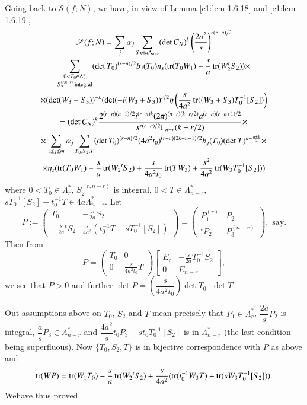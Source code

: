 Going back to $\mathscr{S}(f;N)$, we have, in view of Lemma
\ref{c1:lem-1.6.18} and \ref{c1:lem-1.6.19}, 
\begin{gather*}
\mathscr{S}(f;N)=\sum_{j}\alpha_{j}\sum_{S_{3}\in a\Lambda_{n-r}}(\det
C_{N})^{k}\left(\frac{2a^{2}}{s}\right)^{r(r-n)/2}\\
\sum_{\substack{0<T_{0}\in\Lambda^{\ast}_{r}\\ S_{2}^{(r,n-r)}\text{
      integral}}}(\det
T_{0})^{(r-n)/2}b_{j}(T_{0})n_{s}(\operatorname{tr}(T_{0}W_{1})-\frac{s}{a}\operatorname{tr}(W^{t}_{2}S_{2}))\times
\\
\times (\det
(W_{3}+S_{3}))^{-k}(\det(-i(W_{3}+S_{3}))^{r/2}\eta\left(\frac{s}{4a^{2}}\operatorname{tr}((W_{3}+S_{3})T^{-1}_{0}[S_{2}])\right)\\
=(\det
C_{N})^{k}\frac{2^{(r-n)(n-1)/2}i^{(r-n)k}(2\pi)^{(n-r)(k-r/2)}a^{(r-n)(r+n+1)/2}}{s^{r(r-n)/2}\Gamma_{n-r}(k-r/2)}\times\\
\times \sum_{1\leq j\leq m}\alpha_{j}\sum_{T_{0},S_{2},T}(\det
T_{0})^{(r-n)/2}(4a^{2}t_{0})^{(r-n)(2k-n-1)/2}b_{j}(T_{0})(\det
T)^{k-\frac{n+1}{2}}\times\\
\times \eta_{s}(\operatorname{tr}(T_{0}W_{1})-\frac{s}{a}\operatorname{tr}(W_{2}{}^{t}S_{2})+\frac{s}{4a^{2}t_{0}}\operatorname{tr}(TW_{3})+\frac{s^{2}}{4a^{2}}\operatorname{tr}(W_{3}T^{-1}_{0}[S_{2}]))
\end{gather*}\pageoriginale
where $0<T_{0}\in\Lambda^{\ast}_{r}$, $S^{(r,n-r)}_{2}$ is integral,
$0<T\in \Lambda^{\ast}_{n-r}$, $sT^{-1}_{0}[S_{2}]+t^{-1}_{0}T\in
4a\Lambda^{\ast}_{n-r}$. Let
$$
P:=
\begin{pmatrix}
T_{0} & -\frac{s}{2a}S_{2}\\
-\frac{s}{2a}{}^{t}S_{2} & \frac{s}{4a^{2}}(t^{-1}_{0}T+sT^{-1}_{0}[S_{2}])
\end{pmatrix}
=
\begin{pmatrix}
P^{(r)}_{1} & P_{2}\\
{}^{t}P_{2} & P^{(n-r)}_{3}
\end{pmatrix}
,\text{ \  say.}
$$
Then from
$$
P=
\begin{pmatrix}
T_{0} & 0\\
0 & \frac{s}{4a^{2}t_{0}}T
\end{pmatrix}
\begin{bmatrix}
E_{r} & -\frac{s}{2a}T^{-1}_{0}S_{2}\\
0 & E_{n-r}
\end{bmatrix},
$$
we see that $P>0$ and further $\det
P=\left(\dfrac{s}{4a^{2}t_{0}}\right)\det T_{0}\cdot \det T$.

Out assumptions above on $T_{0}$, $S_{2}$ and $T$ mean precisely that
$P_{1}\in\Lambda^{\ast}_{r}$, $\dfrac{2a}{s}P_{2}$ is integral,
$\dfrac{a}{s}P_{3}\in\Lambda^{\ast}_{n-r}$ and
$\dfrac{4a^{2}}{s}t_{0}P_{3}-st_{0}T^{-1}_{0}[S_{2}]$ is in
$\Lambda^{\ast}_{n-r}$ (the last condition being superfluous). Now
$\{T_{0},S_{2},T\}$ is in bijective correspondence with $P$ as above
and
$$
\operatorname{tr}(WP)=\operatorname{tr}(W_{1}T_{0})-\dfrac{s}{a}\operatorname{tr}(W_{2}{}^{t}S_{2})+\dfrac{s}{4a^{2}}(\operatorname{tr}(t^{-1}_{0}W_{3}T)+\operatorname{tr}(sW_{3}T^{-1}_{0}[S_{2}])).
$$
We\pageoriginale have thus proved


